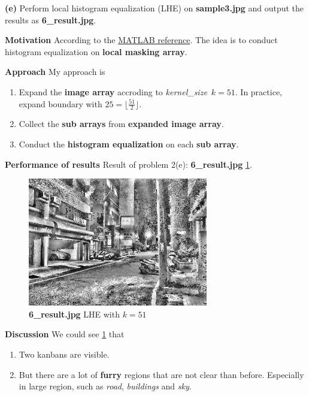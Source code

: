 \textbf{(e)} Perform local histogram equalization (LHE) on \textbf{sample3.jpg} and output the results as \textbf{6\_result.jpg}.

\textbf{Motivation}
According to the \href{https://www.imageeprocessing.com/2011/06/local-histogram-equalization.html}{MATLAB reference}.
The idea is to conduct histogram equalization on \textbf{local masking array}.

\textbf{Approach}
My approach is 
\begin{enumerate}
  \item Expand the \textbf{image array} accroding to \emph{kernel\_size}~\(k=51\). In practice, expand boundary with \(25= \lfloor \frac{51}{2} \rfloor\).
  \item Collect the \textbf{sub arrays} from \textbf{expanded image array}.
  \item Conduct the \textbf{histogram equalization} on each \textbf{sub array}.
\end{enumerate}

\textbf{Performance of results}
Result of problem 2(e): \textbf{6\_result.jpg} \cref{fig2e}.
\begin{figure}
    \centering
    \includegraphics[width=0.7\textwidth]{image/6_result.jpg}
    \caption{\textbf{6\_result.jpg} LHE with $k=51$}
    \label{fig2e}
\end{figure}

\textbf{Discussion}
We could see \cref{fig2e} that
\begin{enumerate}
  \item Two kanbans are visible.
  \item But there are a lot of \textbf{furry} regions that are not clear than before. Especially in large region, such as \textit{road}, \textit{buildings} and \textit{sky}.
\end{enumerate}

